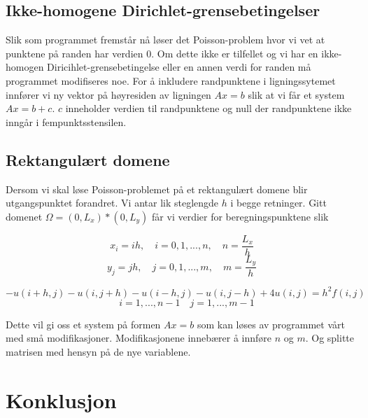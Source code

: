 \documentclass[11pt,norsk,a4paper]{article}
\begin{document}
\subsection{Ikke-homogene Dirichlet-grensebetingelser}
Slik som programmet fremstår nå løser det Poisson-problem hvor vi vet at punktene på randen har verdien 0. Om dette ikke er tilfellet og vi har en ikke-homogen Diricihlet-grensebetingelse eller en annen verdi for randen må programmet modifiseres noe. For å inkludere randpunktene i ligningssytemet innfører vi ny vektor på høyresiden av ligningen $Ax=b$ slik at vi får et system $Ax=b+c$. $c$ inneholder verdien til randpunktene og null der randpunktene ikke inngår i fempunktsstensilen.

\subsection{Rektangulært domene}
Dersom vi skal løse Poisson-problemet på et rektangulært domene blir utgangspunktet forandret. Vi antar lik steglengde $h$ i begge retninger. Gitt domenet $\Omega = (0,L_x)*(0,L_y)$ får vi verdier for beregningspunktene slik

$$ x_i = ih, \quad i=0,1,...,n, \quad n = \frac{L_x}{h}  $$
$$ y_j = jh, \quad j=0,1,...,m, \quad m = \frac{L_y}{h} $$

$$
-u(i+h,j)-u(i,j+h)-u(i-h,j)-u(i,j-h)+4u(i,j) = h^2f(i,j) $$
$$\quad i=1,...,n-1 \quad j=1,...,m-1$$

Dette vil gi oss et system på formen $Ax=b$ som kan løses av programmet vårt med små modifikasjoner. Modifikasjonene innebærer å innføre $n$ og $m$. Og splitte matrisen med hensyn på de nye variablene.

\section{Konklusjon}
\end{document}
